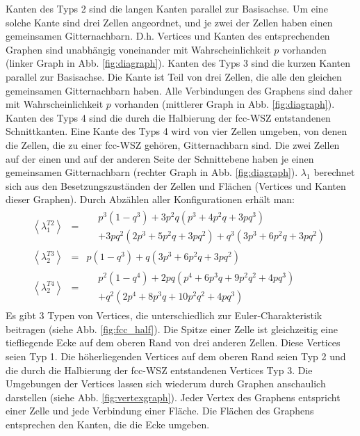 Kanten des Typs 2 sind die langen Kanten parallel zur Basisachse. Um eine solche Kante sind drei Zellen angeordnet, und je zwei der Zellen haben einen gemeinsamen Gitternachbarn. D.h. Vertices und Kanten des entsprechenden Graphen sind unabh\"angig voneinander mit Wahrscheinlichkeit $p$ vorhanden (linker Graph in Abb. \ref{fig:diagraph}). Kanten des Typs 3 sind die kurzen Kanten parallel zur Basisachse. Die Kante ist Teil von drei Zellen, die alle den gleichen gemeinsamen Gitternachbarn haben. Alle Verbindungen des Graphens sind daher mit Wahrscheinlichkeit $p$ vorhanden (mittlerer Graph in Abb. \ref{fig:diagraph}). Kanten des Typs 4 sind die durch die Halbierung der fcc-WSZ entstandenen Schnittkanten. Eine Kante des Typs 4 wird von vier Zellen umgeben, von denen die Zellen, die zu einer fcc-WSZ geh\"oren, Gitternachbarn sind. Die zwei Zellen auf der einen und auf der anderen Seite der Schnittebene haben je einen gemeinsamen Gitternachbarn (rechter Graph in Abb. \ref{fig:diagraph}). $\lambda_1$ berechnet sich aus den Besetzungszust\"anden der Zellen und Fl\"achen (Vertices und Kanten dieser Graphen). Durch Abz\"ahlen aller Konfigurationen erh\"alt man:
\begin{eqnarray}
\left<\lambda_1^{T2}\right> & = &\begin{split} 
 & p^3(1-q^3)+3p^2q(p^3+4p^2q+3pq^3)\\  & +3pq^2(2p^3+5p^2q+3pq^2)+q^3(3p^3+6p^2q+3pq^2)
\end{split}\\
\left<\lambda_2^{T3}\right> & = & p(1-q^3)+q(3p^3+6p^2q+3pq^2)\\
 \left<\lambda_2^{T4}\right> & = &\begin{split}&
  p^2(1-q^4)+2pq(p^4+6p^3q+9p^2q^2+4pq^3)\\ & +q^2(2p^4+8p^3q+10p^2q^2+4pq^3)
\end{split}
\end{eqnarray}
Es gibt 3 Typen von Vertices, die unterschiedlich zur Euler-Charakteristik beitragen (siehe Abb. \ref{fig:fcc_half}). Die Spitze einer Zelle ist gleichzeitig eine tiefliegende Ecke auf dem oberen Rand von drei anderen Zellen. Diese Vertices seien Typ 1. Die h\"oherliegenden Vertices auf dem oberen Rand seien Typ 2 und die durch die Halbierung der fcc-WSZ entstandenen Vertices Typ 3. Die Umgebungen der Vertices lassen sich wiederum  durch Graphen anschaulich darstellen (siehe Abb. \ref{fig:vertexgraph}). Jeder Vertex des Graphens entspricht einer Zelle und jede Verbindung einer Fl\"ache. Die Fl\"achen des Graphens entsprechen den Kanten, die die Ecke umgeben.
